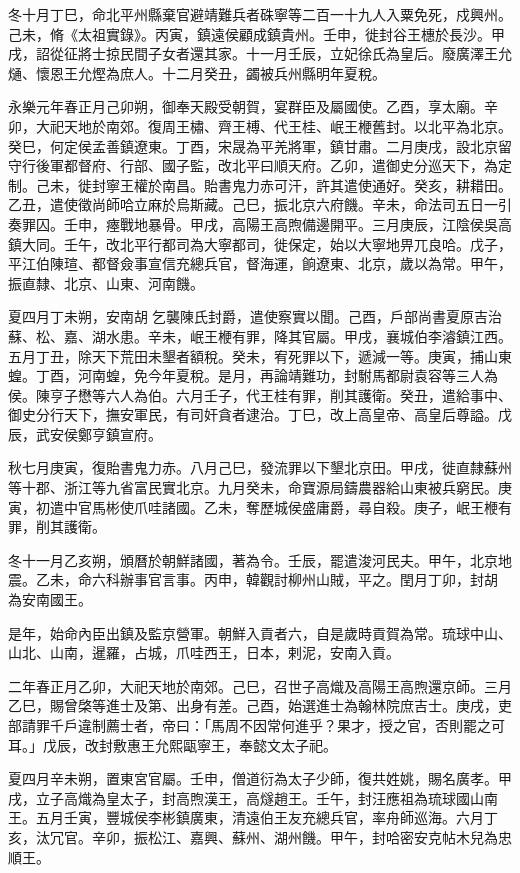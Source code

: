 \begin{pinyinscope}
冬十月丁巳，命北平州縣棄官避靖難兵者硃寧等二百一十九人入粟免死，戍興州。己未，脩《太祖實錄》。丙寅，鎮遠侯顧成鎮貴州。壬申，徙封谷王橞於長沙。甲戌，詔從征將士掠民間子女者還其家。十一月壬辰，立妃徐氏為皇后。廢廣澤王允熥、懷恩王允熞為庶人。十二月癸丑，蠲被兵州縣明年夏稅。

永樂元年春正月己卯朔，御奉天殿受朝賀，宴群臣及屬國使。乙酉，享太廟。辛卯，大祀天地於南郊。復周王橚、齊王榑、代王桂、岷王楩舊封。以北平為北京。癸巳，何定侯孟善鎮遼東。丁酉，宋晟為平羌將軍，鎮甘肅。二月庚戌，設北京留守行後軍都督府、行部、國子監，改北平曰順天府。乙卯，遣御史分巡天下，為定制。己未，徙封寧王權於南昌。貽書鬼力赤可汗，許其遣使通好。癸亥，耕耤田。乙丑，遣使徵尚師哈立麻於烏斯藏。己巳，振北京六府饑。辛未，命法司五日一引奏罪囚。壬申，瘞戰地暴骨。甲戌，高陽王高煦備邊開平。三月庚辰，江陰侯吳高鎮大同。壬午，改北平行都司為大寧都司，徙保定，始以大寧地畀兀良哈。戊子，平江伯陳瑄、都督僉事宣信充總兵官，督海運，餉遼東、北京，歲以為常。甲午，振直隸、北京、山東、河南饑。

夏四月丁未朔，安南胡𡗨乞襲陳氏封爵，遣使察實以聞。己酉，戶部尚書夏原吉治蘇、松、嘉、湖水患。辛未，岷王楩有罪，降其官屬。甲戌，襄城伯李濬鎮江西。五月丁丑，除天下荒田未墾者額稅。癸未，宥死罪以下，遞減一等。庚寅，捕山東蝗。丁酉，河南蝗，免今年夏稅。是月，再論靖難功，封駙馬都尉袁容等三人為侯。陳亨子懋等六人為伯。六月壬子，代王桂有罪，削其護衛。癸丑，遣給事中、御史分行天下，撫安軍民，有司奸貪者逮治。丁巳，改上高皇帝、高皇后尊謚。戊辰，武安侯鄭亨鎮宣府。

秋七月庚寅，復貽書鬼力赤。八月己巳，發流罪以下墾北京田。甲戌，徙直隸蘇州等十郡、浙江等九省富民實北京。九月癸未，命寶源局鑄農器給山東被兵窮民。庚寅，初遣中官馬彬使爪哇諸國。乙未，奪歷城侯盛庸爵，尋自殺。庚子，岷王楩有罪，削其護衛。

冬十一月乙亥朔，頒曆於朝鮮諸國，著為令。壬辰，罷遣浚河民夫。甲午，北京地震。乙未，命六科辦事官言事。丙申，韓觀討柳州山賊，平之。閏月丁卯，封胡𡗨為安南國王。

是年，始命內臣出鎮及監京營軍。朝鮮入貢者六，自是歲時貢賀為常。琉球中山、山北、山南，暹羅，占城，爪哇西王，日本，剌泥，安南入貢。

二年春正月乙卯，大祀天地於南郊。己巳，召世子高熾及高陽王高煦還京師。三月乙巳，賜曾棨等進士及第、出身有差。己酉，始選進士為翰林院庶吉士。庚戌，吏部請罪千戶違制薦士者，帝曰：「馬周不因常何進乎？果才，授之官，否則罷之可耳。」戊辰，改封敷惠王允熙甌寧王，奉懿文太子祀。

夏四月辛未朔，置東宮官屬。壬申，僧道衍為太子少師，復共姓姚，賜名廣孝。甲戌，立子高熾為皇太子，封高煦漢王，高燧趙王。壬午，封汪應祖為琉球國山南王。五月壬寅，豐城侯李彬鎮廣東，清遠伯王友充總兵官，率舟師巡海。六月丁亥，汰冗官。辛卯，振松江、嘉興、蘇州、湖州饑。甲午，封哈密安克帖木兒為忠順王。


\end{pinyinscope}
